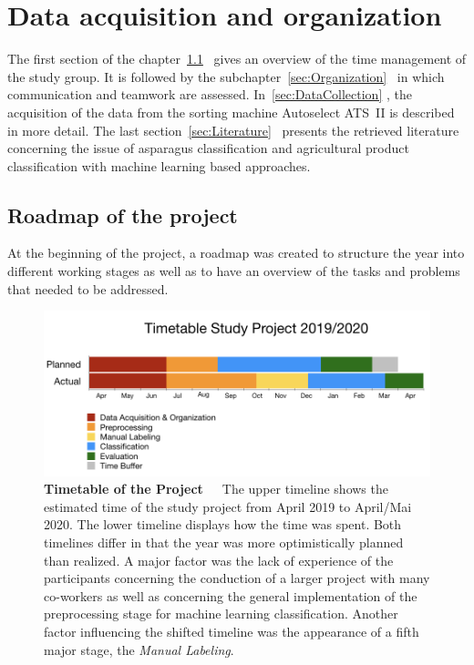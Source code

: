 
\section{Data acquisition and organization}
\label{ch:DataAcquisition}

The first section of the chapter~\ref{sec:Roadmap}~ gives an overview of the time management of the study group. It is followed by the subchapter~\ref{sec:Organization}~ in which communication and teamwork are assessed. In~\ref{sec:DataCollection} , the acquisition of the data from the sorting machine Autoselect ATS~II is described in more detail. The last section~\ref{sec:Literature}~ presents the retrieved literature concerning the issue of asparagus classification and agricultural product classification with machine learning based approaches.

\subsection{Roadmap of the project}
\label{sec:Roadmap}

At the beginning of the project, a roadmap was created to structure the year into different working stages as well as to have an overview of the tasks and problems that needed to be addressed.

\begin{figure}[h]
	\centering
	\includegraphics[scale=0.43]{Figures/chapter02/new_timetable.png}
	\decoRule
	\caption[Timetable of the Project]{\textbf{Timetable of the Project}~~~The upper timeline shows the estimated time of the study project from April 2019 to April/Mai 2020. The lower timeline displays how the time was spent. Both timelines differ in that the year was more optimistically planned than realized. A major factor was the lack of experience of the participants concerning the conduction of a larger project with many co-workers as well as concerning the general implementation of the preprocessing stage for machine learning classification. Another factor influencing the shifted timeline was the appearance of a fifth major stage, the \emph{Manual Labeling}.}
	\label{fig:Timetable}
\end{figure}

